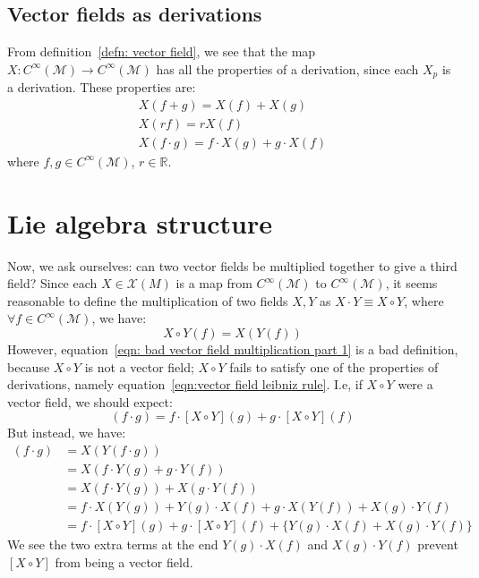   \subsection*{Vector fields as derivations}
    From definition~\ref{defn: vector field}, we see that the map $X: C^\infty(\mathcal{M}) \rightarrow C^\infty(\mathcal{M})$ has all the properties of a derivation, since each $X_p$ is a derivation. These properties are:
    \begin{subequations}
      \begin{gather}
      X(f+g) = X(f) + X(g) \\
      X(rf) = r X(f) \\
      X(f\cdot g) = f\cdot X(g) + g\cdot X(f) \label{eqn:vector field leibniz rule}
      \end{gather}
    \end{subequations}
    where $f,g \in C^\infty(\mathcal{M})$, $r \in \mathbb{R}$.
  \section{Lie algebra structure}
    Now, we ask ourselves: can two vector fields be multiplied together to
    give a third field? Since each $X \in \mathcal{X}(M)$ is a map from
    $C^\infty(\mathcal{M})$ to $C^\infty(\mathcal{M})$, it seems reasonable
    to define the multiplication of two fields $X,Y$ as $X \cdot Y \equiv X \circ Y$, where $\forall f \in C^\infty(\mathcal{M})$, we have:
    \begin{equation}
      \label{eqn: bad vector field multiplication part 1}
      X \circ Y(f) = X(Y(f))
    \end{equation}
    However, equation~\ref{eqn: bad vector field multiplication part 1} is
    a bad definition, because $X\circ Y$ is not a vector field; $X\circ Y$
    fails to satisfy one of the properties of derivations, namely
    equation~\ref{eqn:vector field leibniz rule}.
    I.e, if $X\circ Y$ were a vector field, we should expect:
    \begin{equation*}
      [X\circ Y] (f\cdot g) = f\cdot [X\circ Y](g) + g \cdot [X\circ Y](f)
    \end{equation*}
    But instead, we have:
    \begin{align}
      [X\circ Y] (f\cdot g) &= X(Y(f\cdot g)) \nonumber \\
      &= X(f\cdot Y(g) + g\cdot Y(f)) \nonumber \\
      &= X(f\cdot Y(g)) + X(g\cdot Y(f)) \nonumber \\
      &= f\cdot X(Y(g)) + Y(g)\cdot X(f) + g\cdot X(Y(f)) + X(g) \cdot Y(f)\nonumber  \\
      &= f\cdot [X\circ Y](g) + g \cdot [X\circ Y](f) + \Big\{Y(g)\cdot X(f) +
      X(g) \cdot Y(f) \Big\} \label{eqn: bad vector field multiplication part 2}
    \end{align}
    We see the two extra terms at the end $Y(g)\cdot X(f)$ and
    $X(g) \cdot Y(f)$ prevent $[X\circ Y]$ from being a vector field.

